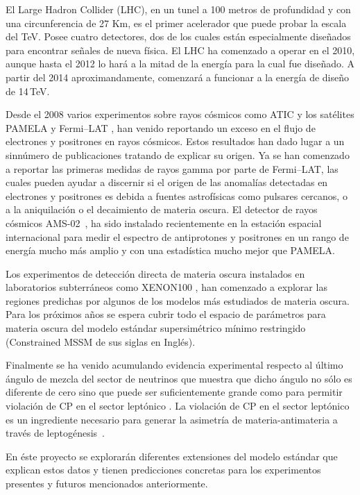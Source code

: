 El Large Hadron Collider (LHC), en un tunel a 100 metros de profundidad y
con una circunferencia de 27 Km, es el primer acelerador
que puede probar la escala del TeV.  Posee cuatro
detectores, dos de los cuales están especialmente diseñados para
encontrar señales de nueva física. El LHC  ha comenzado a
operar en el 2010, aunque hasta el 2012 lo hará a la mitad de la
energía para la cual fue diseñado. A partir del 2014 aproximandamente, comenzará a funcionar a la energía de diseño de 14\,TeV.

Desde el 2008 varios experimentos sobre rayos cósmicos como ATIC
\cite{:2008zzr} y los satélites PAMELA \cite{Adriani:2008zr} y
Fermi--LAT \cite{Abdo:2009zk}, han venido reportando un exceso en el
flujo de electrones y positrones en rayos cósmicos. Estos resultados
han dado lugar a un sinnúmero de publicaciones tratando de explicar su
origen. Ya se han comenzado a reportar las primeras medidas de rayos
gamma por parte de Fermi--LAT, las cuales pueden ayudar a discernir si
el origen de las anomalías detectadas en electrones y positrones es
debida a fuentes astrofísicas como pulsares cercanos, o a la
aniquilación o el decaimiento de materia oscura. El detector de rayos
cósmicos AMS-02~\cite{ams:2009}, ha sido instalado recientemente en la
estación espacial internacional para medir el espectro de antiprotones
y positrones en un rango de energía mucho más amplio y con una
estadística mucho mejor que PAMELA.

Los experimentos de detección directa de materia oscura instalados en
laboratorios subterráneos como XENON100 \cite{Aprile:2011ts}, han
comenzado a explorar las regiones predichas por algunos de los modelos
más estudiados de materia oscura. Para los próximos años se espera
cubrir todo el espacio de parámetros para materia oscura del modelo
estándar supersimétrico mínimo restringido (Constrained MSSM de sus
siglas en Inglés).  

Finalmente se ha venido acumulando evidencia experimental respecto al último ángulo de mezcla del sector de neutrinos que muestra que dicho ángulo no sólo es diferente de cero sino que puede ser suficientemente grande como para permitir violación de CP en el sector leptónico \cite{valle}. La violación de CP en el sector leptónico es un ingrediente necesario para generar la asimetría de materia-antimateria a través de leptogénesis~\cite{Davidson:2008bu}.


En éste proyecto se explorarán diferentes extensiones del modelo
estándar que explican estos datos y tienen predicciones
concretas para los experimentos presentes y futuros mencionados
anteriormente.

